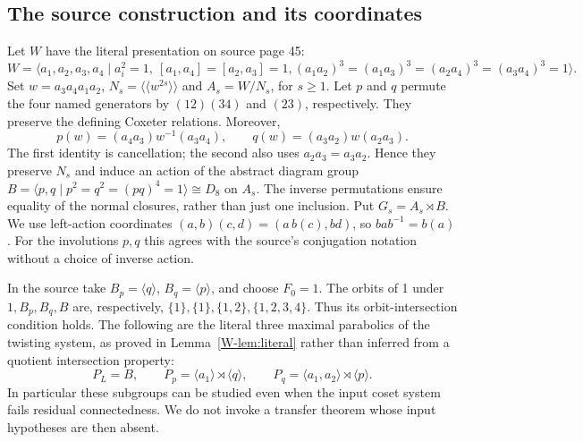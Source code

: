 \subsection{The source construction and its coordinates}
Let $W$ have the literal presentation on source page 45:
\[
 W=\langle a_1,a_2,a_3,a_4\mid a_i^2=1,\ [a_1,a_4]=[a_2,a_3]=1,
 (a_1a_2)^3=(a_1a_3)^3=(a_2a_4)^3=(a_3a_4)^3=1\rangle.
\]
Set $w=a_3a_4a_1a_2$, $N_s=\langle\!\langle w^{2s}\rangle\!\rangle$
and $A_s=W/N_s$, for $s\geq1$. Let $p$ and $q$ permute the four
named generators by $(12)(34)$ and $(23)$, respectively. They preserve
the defining Coxeter relations. Moreover,
\begin{equation}\label{W-eq:invariance}
 p(w)=(a_4a_3)w^{-1}(a_3a_4),\qquad
 q(w)=(a_3a_2)w(a_2a_3).
\end{equation}
The first identity is cancellation; the second also uses
$a_2a_3=a_3a_2$. Hence they preserve $N_s$ and induce an action
of the abstract diagram group
$B=\langle p,q\mid p^2=q^2=(pq)^4=1\rangle\cong D_8$
on $A_s$. The inverse permutations ensure equality of the normal
closures, rather than just one inclusion. Put $G_s=A_s\rtimes B$.
We use left-action coordinates
$(a,b)(c,d)=(a\,b(c),bd)$, so $bab^{-1}=b(a)$.
For the involutions $p,q$ this agrees with the source's conjugation
notation without a choice of inverse action.

In the source take $B_p=\langle q\rangle$,
$B_q=\langle p\rangle$, and choose $F_0=1$. The orbits of 1
under $1,B_p,B_q,B$ are, respectively,
$\{1\},\{1\},\{1,2\},\{1,2,3,4\}$. Thus its orbit-intersection
condition holds. The following are the literal three maximal parabolics of the twisting
system, as proved in Lemma~\ref{W-lem:literal} rather than inferred
from a quotient intersection property:
\begin{equation}\label{W-eq:maximal-literal}
 P_L=B,\qquad
 P_p=\langle a_1\rangle\rtimes\langle q\rangle,\qquad
 P_q=\langle a_1,a_2\rangle\rtimes\langle p\rangle.
\end{equation}
In particular these subgroups can be studied even when the input
coset system fails residual connectedness. We do not invoke a transfer
theorem whose input hypotheses are then absent.

